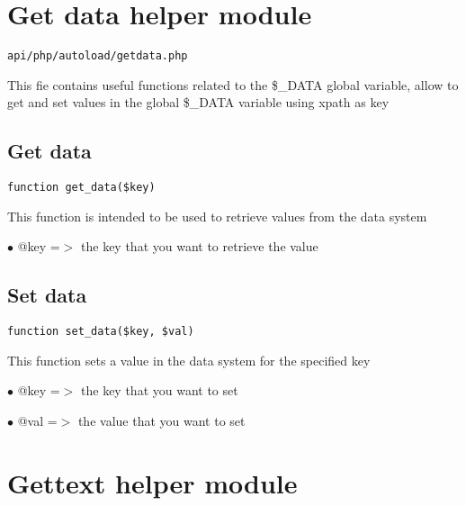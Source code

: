 \documentclass[a4paper]{book}
\begin{document}
\hypertarget{toc144}{}
\section{Get data helper module}

\begin{lstlisting}
api/php/autoload/getdata.php
\end{lstlisting}

This fie contains useful functions related to the \$\_DATA global variable, allow to get and set
values in the global \$\_DATA variable using xpath as key

\hypertarget{toc145}{}
\subsection{Get data}

\begin{lstlisting}
function get_data($key)
\end{lstlisting}

This function is intended to be used to retrieve values from the
data system

\begin{compactitem}
\item[\color{myblue}$\bullet$] @key =$>$ the key that you want to retrieve the value
\end{compactitem}

\hypertarget{toc146}{}
\subsection{Set data}

\begin{lstlisting}
function set_data($key, $val)
\end{lstlisting}

This function sets a value in the data system for the specified key

\begin{compactitem}
\item[\color{myblue}$\bullet$] @key =$>$ the key that you want to set
\item[\color{myblue}$\bullet$] @val =$>$ the value that you want to set
\end{compactitem}

\hypertarget{toc147}{}
\section{Gettext helper module}
\end{document}
